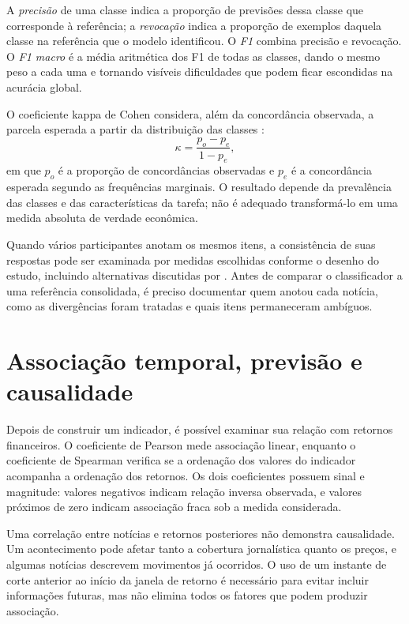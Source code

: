 A \emph{precisão} de uma classe indica a proporção de previsões dessa classe que corresponde à referência; a \emph{revocação} indica a proporção de exemplos daquela classe na referência que o modelo identificou. O \emph{F1} combina precisão e revocação. O \emph{F1 macro} é a média aritmética dos F1 de todas as classes, dando o mesmo peso a cada uma e tornando visíveis dificuldades que podem ficar escondidas na acurácia global.

O coeficiente kappa de Cohen considera, além da concordância observada, a parcela esperada a partir da distribuição das classes \cite{cohen1960kappa}:
\begin{equation}
    \kappa = \frac{p_o-p_e}{1-p_e},
\end{equation}
\noindent em que $p_o$ é a proporção de concordâncias observadas e $p_e$ é a concordância esperada segundo as frequências marginais. O resultado depende da prevalência das classes e das características da tarefa; não é adequado transformá-lo em uma medida absoluta de verdade econômica.

Quando vários participantes anotam os mesmos itens, a consistência de suas respostas pode ser examinada por medidas escolhidas conforme o desenho do estudo, incluindo alternativas discutidas por . Antes de comparar o classificador a uma referência consolidada, é preciso documentar quem anotou cada notícia, como as divergências foram tratadas e quais itens permaneceram ambíguos.

\section{Associação temporal, previsão e causalidade}

Depois de construir um indicador, é possível examinar sua relação com retornos financeiros. O coeficiente de Pearson mede associação linear, enquanto o coeficiente de Spearman verifica se a ordenação dos valores do indicador acompanha a ordenação dos retornos. Os dois coeficientes possuem sinal e magnitude: valores negativos indicam relação inversa observada, e valores próximos de zero indicam associação fraca sob a medida considerada.

Uma correlação entre notícias e retornos posteriores não demonstra causalidade. Um acontecimento pode afetar tanto a cobertura jornalística quanto os preços, e algumas notícias descrevem movimentos já ocorridos. O uso de um instante de corte anterior ao início da janela de retorno é necessário para evitar incluir informações futuras, mas não elimina todos os fatores que podem produzir associação.


